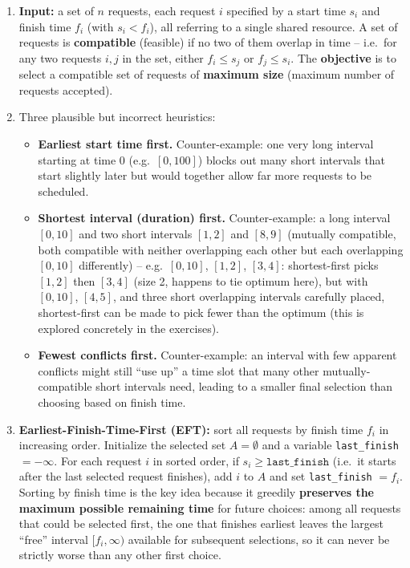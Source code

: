 \documentclass[11pt]{article}
\begin{document}
\begin{enumerate}[label=\textbf{A\arabic*.}, leftmargin=2.2em]
\item \textbf{Input:} a set of $n$ requests, each request $i$ specified by a start time
$s_i$ and finish time $f_i$ (with $s_i < f_i$), all referring to a single shared resource.
A set of requests is \textbf{compatible} (feasible) if no two of them overlap in time --
i.e.\ for any two requests $i,j$ in the set, either $f_i \le s_j$ or $f_j \le s_i$. The
\textbf{objective} is to select a compatible set of requests of \textbf{maximum size}
(maximum number of requests accepted).

\item Three plausible but incorrect heuristics:
\begin{itemize}
    \item \textbf{Earliest start time first.} Counter-example: one very long interval
    starting at time 0 (e.g.\ $[0,100]$) blocks out many short intervals that start
    slightly later but would together allow far more requests to be scheduled.
    \item \textbf{Shortest interval (duration) first.} Counter-example: a long interval
    $[0,10]$ and two short intervals $[1,2]$ and $[8,9]$ (mutually compatible, both
    compatible with neither overlapping each other but each overlapping $[0,10]$
    differently) -- e.g.\ $[0,10]$, $[1,2]$, $[3,4]$: shortest-first picks $[1,2]$ then
    $[3,4]$ (size 2, happens to tie optimum here), but with $[0,10]$, $[4,5]$, and three
    short overlapping intervals carefully placed, shortest-first can be made to pick fewer
    than the optimum (this is explored concretely in the exercises).
    \item \textbf{Fewest conflicts first.} Counter-example: an interval with few apparent
    conflicts might still ``use up'' a time slot that many other mutually-compatible short
    intervals need, leading to a smaller final selection than choosing based on finish
    time.
\end{itemize}

\item \textbf{Earliest-Finish-Time-First (EFT):} sort all requests by finish time $f_i$
in increasing order. Initialize the selected set $A = \emptyset$ and a variable
\texttt{last\_finish} $= -\infty$. For each request $i$ in sorted order, if $s_i \ge
\texttt{last\_finish}$ (i.e.\ it starts after the last selected request finishes), add $i$
to $A$ and set \texttt{last\_finish} $= f_i$. Sorting by finish time is the key idea
because it greedily \textbf{preserves the maximum possible remaining time} for future
choices: among all requests that could be selected first, the one that finishes earliest
leaves the largest ``free'' interval $[f_i, \infty)$ available for subsequent selections,
so it can never be strictly worse than any other first choice.


\end{enumerate}
\end{document}

